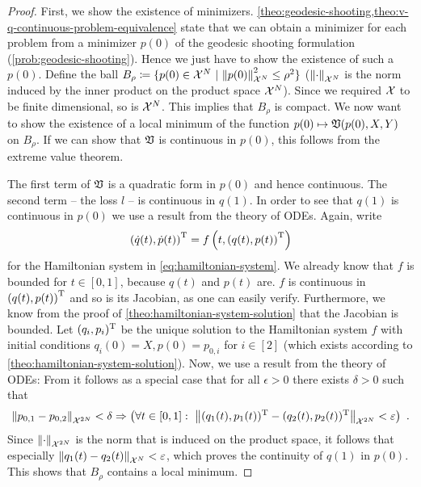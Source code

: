 \begin{proof}
	First, we show the existence of minimizers.
	\cref{theo:geodesic-shooting,theo:v-q-continuous-problem-equivalence} state that we can obtain a minimizer for each problem from a minimizer $p(0)$ of the geodesic shooting formulation (\cref{prob:geodesic-shooting}).
	Hence we just have to show the existence of such a $p(0)$.
	Define the ball $B_\rho \coloneqq \{p(0) \in \mathcal{X}^N\ | \ \norm{p(0)}_{\mathcal{X}^N}^2 \leq \rho^2 \}$ ($\norm{\cdot}_{\mathcal{X}^N}$ is the norm induced by the inner product on the product space $\mathcal{X}^N$).
	Since we required $\mathcal{X}$ to be finite dimensional, so is $\mathcal{X}^N$.
	This implies that $B_\rho$ is compact.
	We now want to show the existence of a local minimum of the function $p(0) \mapsto \mathfrak{V}(p(0), X, Y)$ on $B_\rho$.
	If we can show that $\mathfrak{V}$ is continuous in $p(0)$, this follows from the extreme value theorem.
	
	The first term of $\mathfrak{V}$ is a quadratic form in $p(0)$ and hence continuous.
	The second term -- the loss $l$ -- is continuous in $q(1)$.
	In order to see that $q(1)$ is continuous in $p(0)$ we use a result from the theory of ODEs.
	Again, write
	\begin{equation}
	\left(\dot{q}(t), \dot{p}(t)\right)^{\mathrm{T}} = f\left(t, \left(q(t), p(t)\right)^{\mathrm{T}} \right)
	\end{equation}
	for the Hamiltonian system in \cref{eq:hamiltonian-system}.
	We already know that $f$ is bounded for $t \in [0, 1]$, because $q(t)$ and $p(t)$ are.
	$f$ is continuous in $\left(q(t), p(t)\right)^{\mathrm{T}}$ and so is its Jacobian, as one can easily verify.
	Furthermore, we know from the proof of \cref{theo:hamiltonian-system-solution} that the Jacobian is bounded.
	Let $(q_i, p_i)^{\mathrm{T}}$ be the unique solution to the Hamiltonian system $f$ with initial conditions $q_i(0) = X, p(0) = p_{0, i}$ for $i \in [2]$ (which exists according to \cref{theo:hamiltonian-system-solution}).
	Now, we use a result from the theory of ODEs:
	From \cite[Theorem~1.4.1]{arino06} it follows as a special case that for all $\epsilon > 0$ there exists $\delta > 0$ such that
	\begin{equation}
	\norm{p_{0, 1} - p_{0, 2}}_{\mathcal{X}^{2N}} < \delta \Rightarrow 
	\left(\forall t \in [0, 1]:\ \norm{(q_1(t), p_1(t))^{\mathrm{T}} - (q_2(t), p_2(t))^{\mathrm{T}}}_{\mathcal{X}^{2N}} < \varepsilon \right) \ .
	\end{equation}
	Since $\norm{\cdot}_{\mathcal{X}^{2N}}$ is the norm that is induced on the product space, it follows that especially $\norm{q_1(t) - q_2(t)}_{\mathcal{X}^N} < \varepsilon$, which proves the continuity of $q(1)$ in $p(0)$.
	This shows that $B_\rho$ contains a local minimum.
	

\end{proof}

